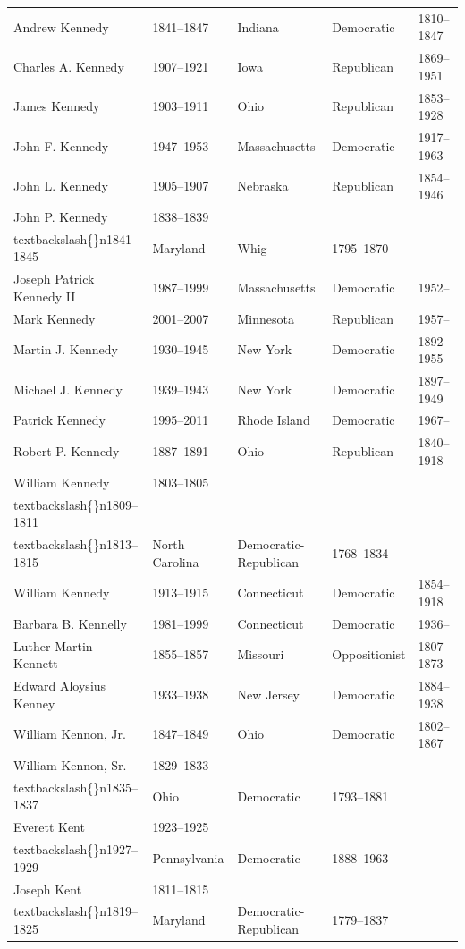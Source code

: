 \documentclass{article}
\begin{document}
\begin{tabular}{lllll}
Andrew Kennedy & 1841–1847 & Indiana & Democratic & 1810–1847 \\
Charles A. Kennedy & 1907–1921 & Iowa & Republican & 1869–1951 \\
James Kennedy & 1903–1911 & Ohio & Republican & 1853–1928 \\
John F. Kennedy & 1947–1953 & Massachusetts & Democratic & 1917–1963 \\
John L. Kennedy & 1905–1907 & Nebraska & Republican & 1854–1946 \\
John P. Kennedy & 1838–1839\\textbackslash\{\}n1841–1845 & Maryland & Whig & 1795–1870 \\
Joseph Patrick Kennedy II & 1987–1999 & Massachusetts & Democratic & 1952– \\
Mark Kennedy & 2001–2007 & Minnesota & Republican & 1957– \\
Martin J. Kennedy & 1930–1945 & New York & Democratic & 1892–1955 \\
Michael J. Kennedy & 1939–1943 & New York & Democratic & 1897–1949 \\
Patrick Kennedy & 1995–2011 & Rhode Island & Democratic & 1967– \\
Robert P. Kennedy & 1887–1891 & Ohio & Republican & 1840–1918 \\
William Kennedy & 1803–1805\\textbackslash\{\}n1809–1811\\textbackslash\{\}n1813–1815 & North Carolina & Democratic-Republican & 1768–1834 \\
William Kennedy & 1913–1915 & Connecticut & Democratic & 1854–1918 \\
Barbara B. Kennelly & 1981–1999 & Connecticut & Democratic & 1936– \\
Luther Martin Kennett & 1855–1857 & Missouri & Oppositionist & 1807–1873 \\
Edward Aloysius Kenney & 1933–1938 & New Jersey & Democratic & 1884–1938 \\
William Kennon, Jr. & 1847–1849 & Ohio & Democratic & 1802–1867 \\
William Kennon, Sr. & 1829–1833\\textbackslash\{\}n1835–1837 & Ohio & Democratic & 1793–1881 \\
Everett Kent & 1923–1925\\textbackslash\{\}n1927–1929 & Pennsylvania & Democratic & 1888–1963 \\
Joseph Kent & 1811–1815\\textbackslash\{\}n1819–1825 & Maryland & Democratic-Republican & 1779–1837 \\

\end{tabular}
\end{document}
